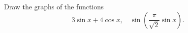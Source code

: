 Draw the graphs of the functions
\[
3\sin x + 4\cos x,\quad
\sin\left(\frac{\pi}{\sqrt{2}} \sin x\right).
\]

